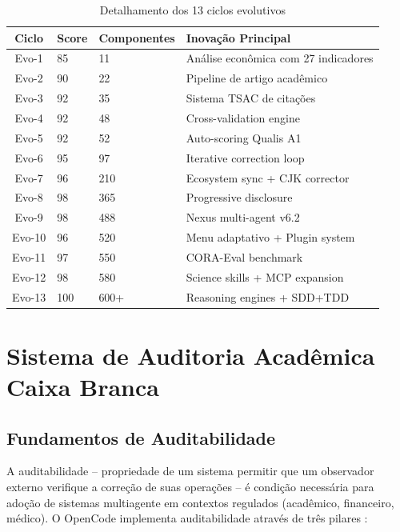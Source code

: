 \documentclass[12pt,a4paper,sumario=tradicional]{abntex2}
\begin{document}
\begin{table}[H]
\centering
\caption{Detalhamento dos 13 ciclos evolutivos}
\label{tab:evolution-detail}
\begin{tabular}{@{}cllp{4cm}@{}}
\toprule
\textbf{Ciclo} & \textbf{Score} & \textbf{Componentes} & \textbf{Inovação Principal} \\
\midrule
Evo-1 & 85 & 11 & Análise econômica com 27 indicadores \\
Evo-2 & 90 & 22 & Pipeline de artigo acadêmico \\
Evo-3 & 92 & 35 & Sistema TSAC de citações \\
Evo-4 & 92 & 48 & Cross-validation engine \\
Evo-5 & 92 & 52 & Auto-scoring Qualis A1 \\
Evo-6 & 95 & 97 & Iterative correction loop \\
Evo-7 & 96 & 210 & Ecosystem sync + CJK corrector \\
Evo-8 & 98 & 365 & Progressive disclosure \\
Evo-9 & 98 & 488 & Nexus multi-agent v6.2 \\
Evo-10 & 96 & 520 & Menu adaptativo + Plugin system \\
Evo-11 & 97 & 550 & CORA-Eval benchmark \\
Evo-12 & 98 & 580 & Science skills + MCP expansion \\
Evo-13 & 100 & 600+ & Reasoning engines + SDD+TDD \\
\bottomrule
\end{tabular}
\end{table}

\chapter{Sistema de Auditoria Acadêmica Caixa Branca}

\section{Fundamentos de Auditabilidade}

A auditabilidade -- propriedade de um sistema permitir que um observador externo verifique a correção de suas operações -- é condição necessária para adoção de sistemas multiagente em contextos regulados (acadêmico, financeiro, médico). O OpenCode implementa auditabilidade através de três pilares \cite{pudasaini2024survey, eslit2025ai}:
\end{document}
